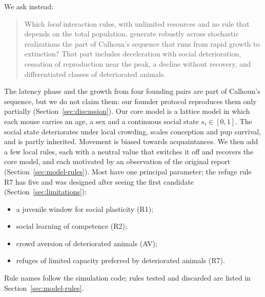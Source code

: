 We ask instead:
\begin{quote}
Which \emph{local} interaction rules, with unlimited resources and no rule that depends on the total population,
generate robustly across stochastic realizations the part of Calhoun's sequence that runs from rapid growth to
extinction?
That part includes deceleration with social deterioration, cessation of reproduction near the peak, a decline
without recovery, and differentiated classes of deteriorated animals.
\end{quote}
The latency phase and the growth from four founding pairs are part of Calhoun's sequence, but we do not claim them:
our founder protocol reproduces them only partially (Section~\ref{sec:discussion}).
Our core model is a lattice model in which each mouse carries an age, a sex and a continuous social state $s_i\in[0,1]$.
The social state deteriorates under local crowding, scales conception and pup survival, and is partly inherited.
Movement is biased towards acquaintances.
We then add a few local rules, each with a neutral value that switches it off and recovers the core model, and each motivated by an
observation of the original report (Section~\ref{sec:model-rules}). Most have one principal parameter; the refuge
rule R7 has five and was designed after seeing the first candidate (Section~\ref{sec:limitations}):
\begin{itemize}
\item a juvenile window for social plasticity (R1);
\item social learning of competence (R2);
\item crowd aversion of deteriorated animals (AV);
\item refuges of limited capacity preferred by deteriorated animals (R7).
\end{itemize}
Rule names follow the simulation code; rules tested and discarded are listed in Section~\ref{sec:model-rules}.

